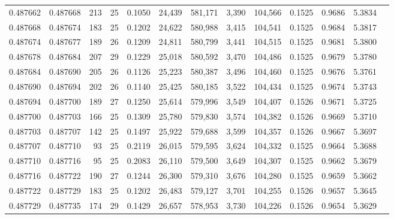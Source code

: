 \begin{tabular}{rrrrrrrrrrrrr}
0.487662 & 0.487668 & 213 &  25 &                                     0.1050 &  24,439 & 581,171 &   3,390 & 104,566 & 0.1525 & 0.9686 & 5.3834 \\
0.487668 & 0.487674 & 183 &  25 &                                     0.1202 &  24,622 & 580,988 &   3,415 & 104,541 & 0.1525 & 0.9684 & 5.3817 \\
0.487674 & 0.487677 & 189 &  26 &                                     0.1209 &  24,811 & 580,799 &   3,441 & 104,515 & 0.1525 & 0.9681 & 5.3800 \\
0.487678 & 0.487684 & 207 &  29 &                                     0.1229 &  25,018 & 580,592 &   3,470 & 104,486 & 0.1525 & 0.9679 & 5.3780 \\
0.487684 & 0.487690 & 205 &  26 &                                     0.1126 &  25,223 & 580,387 &   3,496 & 104,460 & 0.1525 & 0.9676 & 5.3761 \\
0.487690 & 0.487694 & 202 &  26 &                                     0.1140 &  25,425 & 580,185 &   3,522 & 104,434 & 0.1525 & 0.9674 & 5.3743 \\
0.487694 & 0.487700 & 189 &  27 &                                     0.1250 &  25,614 & 579,996 &   3,549 & 104,407 & 0.1526 & 0.9671 & 5.3725 \\
0.487700 & 0.487703 & 166 &  25 &                                     0.1309 &  25,780 & 579,830 &   3,574 & 104,382 & 0.1526 & 0.9669 & 5.3710 \\
0.487703 & 0.487707 & 142 &  25 &                                     0.1497 &  25,922 & 579,688 &   3,599 & 104,357 & 0.1526 & 0.9667 & 5.3697 \\
0.487707 & 0.487710 &  93 &  25 &                                     0.2119 &  26,015 & 579,595 &   3,624 & 104,332 & 0.1525 & 0.9664 & 5.3688 \\
0.487710 & 0.487716 &  95 &  25 &                                     0.2083 &  26,110 & 579,500 &   3,649 & 104,307 & 0.1525 & 0.9662 & 5.3679 \\
0.487716 & 0.487722 & 190 &  27 &                                     0.1244 &  26,300 & 579,310 &   3,676 & 104,280 & 0.1525 & 0.9659 & 5.3662 \\
0.487722 & 0.487729 & 183 &  25 &                                     0.1202 &  26,483 & 579,127 &   3,701 & 104,255 & 0.1526 & 0.9657 & 5.3645 \\
0.487729 & 0.487735 & 174 &  29 &                                     0.1429 &  26,657 & 578,953 &   3,730 & 104,226 & 0.1526 & 0.9654 & 5.3629 \\

\end{tabular}

